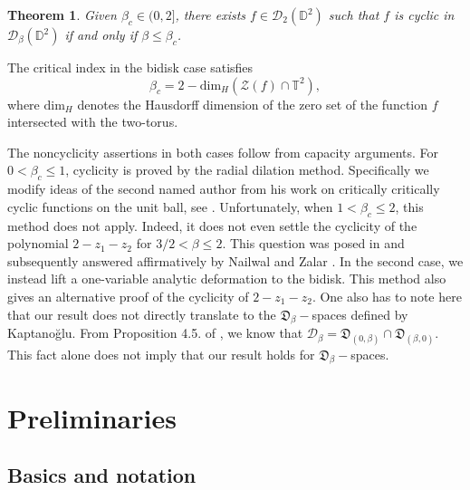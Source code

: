 \documentclass[a4paper,12pt]{amsart}
\newtheorem{thm}{Theorem}[section]
\theoremstyle{definition}
\def\D{\mathbb D}
\begin{document}
    \begin{thm} \label{MainThm1}
        Given $\beta_c \in (0,2]$, there exists $f \in \mathcal D_2(\D^2)$ such that $f$ is cyclic in $\mathcal D_\beta(\D^2)$ if and only if $\beta \leq \beta_c$.
    \end{thm}

The critical index in the bidisk case satisfies
$$\beta_c=2-\mathrm{dim}_H(\mathcal{Z}(f)\cap \mathbb{T}^2),$$ where $\mathrm{dim}_H$ denotes the Hausdorff dimension of the zero set of the function $f$ intersected with the two-torus.

The noncyclicity assertions in both cases follow from capacity
arguments. For \(0<\beta_c\leq1\), cyclicity is proved by the radial
dilation method. Specifically we modify ideas of the second named author from his work on critically critically cyclic functions on the unit ball, see \cite{Pouriya_CriticalBall}. Unfortunately, when \(1<\beta_c\leq2\), this method does not apply. Indeed, it does not even settle the cyclicity of the polynomial
\(2-z_1-z_2\) for \(3/2<\beta\leq2\). This question was posed in
\cite[Open Problem~1]{Pouriya_FirstPaper} and subsequently answered
affirmatively by Nailwal and Zalar \cite{NailwalZalar2026}. In the
second case, we instead lift a one-variable analytic deformation to
the bidisk. This method also gives an alternative proof of the
cyclicity of \(2-z_1-z_2\). One also has to note here that our result does not directly translate to the $\mathfrak{D}_{\beta}-$spaces defined by Kaptano\u glu. From Proposition 4.5. of \cite{BesliSola}, we know that $\mathcal{D}_{\beta}=\mathfrak{D}_{(0,\beta)}\cap\mathfrak{D}_{(\beta,0)}.$ This fact alone does not imply that our result holds for $\mathfrak{D_{\beta}}-$spaces. 

\section{Preliminaries} \label{Section2}
\subsection{Basics and notation} \label{Subsec2.1}
\end{document}
